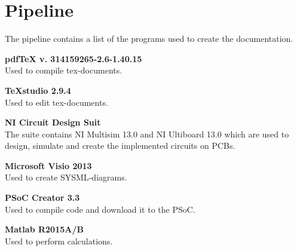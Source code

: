 \section{Pipeline}
The pipeline contains a list of the programs used to create the documentation.

\textbf{pdfTeX v. 314159265-2.6-1.40.15}\\
Used to compile tex-documents.

\textbf{TeXstudio 2.9.4}\\
Used to edit tex-documents.

\textbf{NI Circuit Design Suit}\\
The suite contains NI Multisim 13.0 and NI Ultiboard 13.0 which are used to design, simulate and create the implemented circuits on PCBs.

\textbf{Microsoft Visio 2013}\\
Used to create SYSML-diagrams.

\textbf{PSoC Creator 3.3}\\
Used to compile code and download it to the PSoC.

\textbf{Matlab R2015A/B}\\
Used to perform calculations.